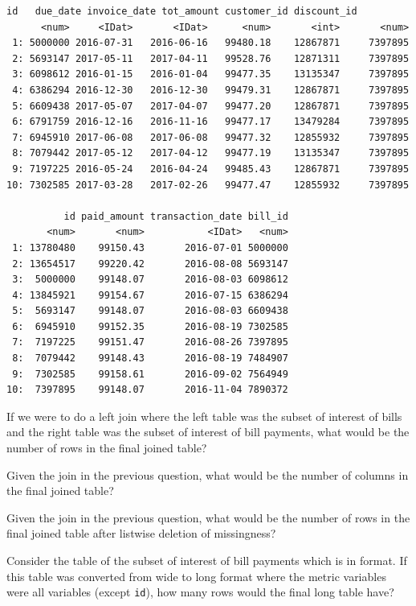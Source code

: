 \documentclass[12pt]{article}
\begin{document}
\begin{Verbatim}[frame=single]
         id   due_date invoice_date tot_amount customer_id discount_id
      <num>     <IDat>       <IDat>      <num>       <int>       <num>
 1: 5000000 2016-07-31   2016-06-16   99480.18    12867871     7397895
 2: 5693147 2017-05-11   2017-04-11   99528.76    12871311     7397895
 3: 6098612 2016-01-15   2016-01-04   99477.35    13135347     7397895
 4: 6386294 2016-12-30   2016-12-30   99479.31    12867871     7397895
 5: 6609438 2017-05-07   2017-04-07   99477.20    12867871     7397895
 6: 6791759 2016-12-16   2016-11-16   99477.17    13479284     7397895
 7: 6945910 2017-06-08   2017-06-08   99477.32    12855932     7397895
 8: 7079442 2017-05-12   2017-04-12   99477.19    13135347     7397895
 9: 7197225 2016-05-24   2016-04-24   99485.43    12867871     7397895
10: 7302585 2017-03-28   2017-02-26   99477.47    12855932     7397895

          id paid_amount transaction_date bill_id
       <num>       <num>           <IDat>   <num>
 1: 13780480    99150.43       2016-07-01 5000000
 2: 13654517    99220.42       2016-08-08 5693147
 3:  5000000    99148.07       2016-08-03 6098612
 4: 13845921    99154.67       2016-07-15 6386294
 5:  5693147    99148.07       2016-08-03 6609438
 6:  6945910    99152.35       2016-08-19 7302585
 7:  7197225    99151.47       2016-08-26 7397895
 8:  7079442    99148.43       2016-08-19 7484907
 9:  7302585    99158.61       2016-09-02 7564949
10:  7397895    99148.07       2016-11-04 7890372
\end{Verbatim}

\benum
{} If we were to do a left join where the left table was the subset of interest of bills and the right table was the subset of interest of bill payments, what would be the number of rows in the final joined table? %

 Given the join in the previous question, what would be the number of columns in the final joined table?%

 Given the join in the previous question, what would be the number of rows in the final joined table after listwise deletion of missingness?%

 Consider the table of the subset of interest of bill payments which is in  format. If this table was converted from wide to long format where the metric variables were all variables (except \texttt{id}), how many rows would the final long table have? %
\end{document}
